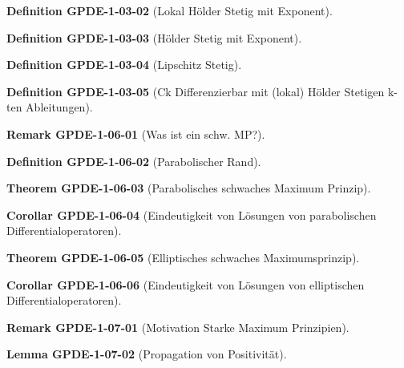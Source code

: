 \documentclass[10pt, letterpaper]{article}
\newcommand{\CustomHeading}[3]{%
  \par\medskip\noindent%
  \textbf{#1 #2} \textnormal{(#3)}.\enskip%
}
\newenvironment{DEF}[2]{\CustomHeading{Definition}{#1}{#2}}{}
\newenvironment{THEO}[2]{\CustomHeading{Theorem}{#1}{#2}}{}
\newenvironment{LEM}[2]{\CustomHeading{Lemma}{#1}{#2}}{}
\newenvironment{KORO}[2]{\CustomHeading{Corollar}{#1}{#2}}{}
\newenvironment{REM}[2]{\CustomHeading{Remark}{#1}{#2}}{}
\begin{document}
\begin{DEF}{GPDE-1-03-02}{Lokal Hölder Stetig mit Exponent}
\end{DEF}

\begin{DEF}{GPDE-1-03-03}{Hölder Stetig mit Exponent}
\end{DEF}

\begin{DEF}{GPDE-1-03-04}{Lipschitz Stetig}
\end{DEF}

\begin{DEF}{GPDE-1-03-05}{Ck Differenzierbar mit (lokal) Hölder Stetigen k-ten Ableitungen}
\end{DEF}

\begin{REM}{GPDE-1-06-01}{Was ist ein schw. MP?}
\end{REM}

\begin{DEF}{GPDE-1-06-02}{Parabolischer Rand}
\end{DEF}

\begin{THEO}{GPDE-1-06-03}{Parabolisches schwaches Maximum Prinzip}
\end{THEO}

\begin{KORO}{GPDE-1-06-04}{Eindeutigkeit von Lösungen von parabolischen Differentialoperatoren}
\end{KORO}

\begin{THEO}{GPDE-1-06-05}{Elliptisches schwaches Maximumsprinzip}
\end{THEO}

\begin{KORO}{GPDE-1-06-06}{Eindeutigkeit von Lösungen von elliptischen Differentialoperatoren}
\end{KORO}

\begin{REM}{GPDE-1-07-01}{Motivation Starke Maximum Prinzipien}
\end{REM}

\begin{LEM}{GPDE-1-07-02}{Propagation von Positivität}
\end{LEM}
\end{document}
